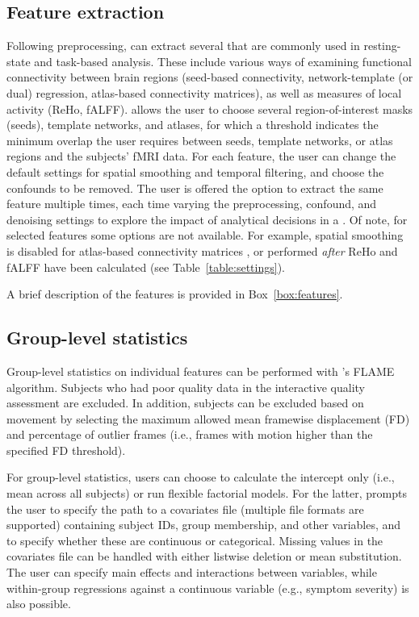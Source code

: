 \subsection{Feature extraction}\label{sec:featureextraction}

Following preprocessing,  can extract several  that are commonly used in resting-state and task-based analysis. These include various ways of examining functional connectivity between brain regions (seed-based connectivity, network-template (or dual) regression, atlas-based connectivity matrices), as well as measures of local activity (ReHo, fALFF).  allows the user to choose several region-of-interest masks (seeds), template networks, and atlases, for which a threshold indicates the minimum overlap the user requires between seeds, template networks, or atlas regions and the subjects' fMRI data. For each feature, the user can change the default settings for spatial smoothing and temporal filtering, and choose the confounds to be removed. The user is offered the option to extract the same feature multiple times, each time varying the preprocessing, confound, and denoising settings to explore the impact of analytical decisions in a . Of note, for selected features some options are not available. For example, spatial smoothing is disabled for atlas-based connectivity matrices \parencite{alakorkko2017}, or performed \emph{after} ReHo and fALFF have been calculated (see Table~\ref{table:settings}).

A brief description of the features is provided in Box~\ref{box:features}.

\subsection{Group-level statistics}

Group-level statistics on individual features can be performed with 's FLAME algorithm. Subjects who had poor quality data in the interactive quality assessment are excluded. In addition, subjects can be excluded based on movement by selecting the maximum allowed mean framewise displacement (FD) and percentage of outlier frames (i.e., frames with motion higher than the specified FD threshold).

For group-level statistics, users can choose to calculate the intercept only (i.e., mean across all subjects) or run flexible factorial models. For the latter,  prompts the user to specify the path to a covariates file (multiple file formats are supported) containing subject IDs, group membership, and other variables, and to specify whether these are continuous or categorical. Missing values in the covariates file can be handled with either listwise deletion or mean substitution. The user can specify main effects and interactions between variables, while within-group regressions against a continuous variable (e.g., symptom severity) is also possible.

